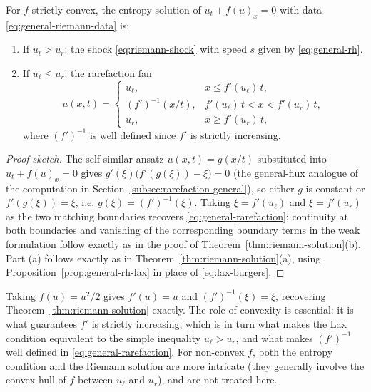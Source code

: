 \begin{proposition}
\label{prop:general-riemann}
For $f$ strictly convex, the entropy solution of $u_t+f(u)_x=0$ with data
\eqref{eq:general-riemann-data} is:
\begin{enumerate}
  \item[\textup{(a)}] If $u_\ell>u_r$: the shock \eqref{eq:riemann-shock}
  with speed $s$ given by \eqref{eq:general-rh}.
  \item[\textup{(b)}] If $u_\ell \leq u_r$: the rarefaction fan
  \begin{equation}
    \label{eq:general-rarefaction}
    u(x,t) = \begin{cases}
      u_\ell, & x \le f'(u_\ell)\, t, \\
      (f')^{-1}(x/t), & f'(u_\ell)\, t < x < f'(u_r)\, t, \\
      u_r, & x \ge f'(u_r)\, t,
    \end{cases}
  \end{equation}
  where $(f')^{-1}$ is well defined since $f'$ is strictly increasing.
\end{enumerate}
\end{proposition}

\begin{proof}[Proof sketch]
The self-similar ansatz $u(x,t)=g(x/t)$ substituted into $u_t+f(u)_x=0$
gives $g'(\xi)\big(f'(g(\xi))-\xi\big)=0$ (the general-flux analogue of
the computation in Section~\ref{subsec:rarefaction-general}), so either
$g$ is constant or $f'(g(\xi))=\xi$, i.e. $g(\xi)=(f')^{-1}(\xi)$. Taking
$\xi = f'(u_\ell)$ and $\xi=f'(u_r)$ as the two matching boundaries
recovers \eqref{eq:general-rarefaction}; continuity at both boundaries
and vanishing of the corresponding boundary terms in the weak formulation
follow exactly as in the proof of Theorem~\ref{thm:riemann-solution}(b).
Part (a) follows exactly as in Theorem~\ref{thm:riemann-solution}(a),
using Proposition~\ref{prop:general-rh-lax} in place of
\eqref{eq:lax-burgers}.
\end{proof}

\begin{remark}
Taking $f(u)=u^2/2$ gives $f'(u)=u$ and $(f')^{-1}(\xi)=\xi$, recovering
Theorem~\ref{thm:riemann-solution} exactly. The role of convexity is
essential: it is what guarantees $f'$ is strictly increasing, which is in
turn what makes the Lax condition equivalent to the simple inequality
$u_\ell>u_r$, and what makes $(f')^{-1}$ well defined in
\eqref{eq:general-rarefaction}. For non-convex $f$, both the entropy
condition and the Riemann solution are more intricate (they generally
involve the convex hull of $f$ between $u_\ell$ and $u_r$), and are not
treated here.
\end{remark}

